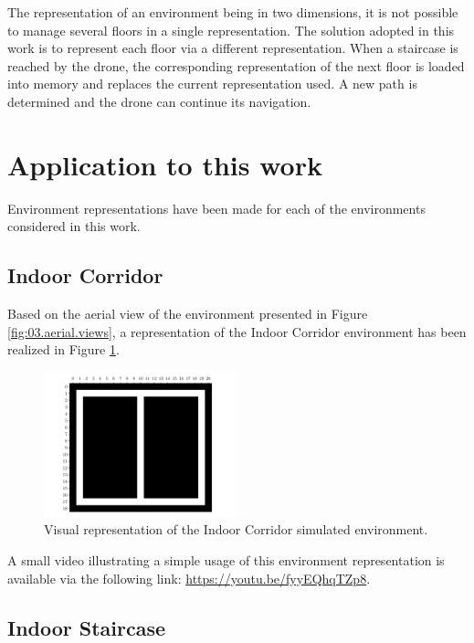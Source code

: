 The representation of an environment being in two dimensions, it is not possible to manage several floors in a single representation. The solution adopted in this work is to represent each floor via a different representation. When a staircase is reached by the drone, the corresponding representation of the next floor is loaded into memory and replaces the current representation used. A new path is determined and the drone can continue its navigation.

\section{Application to this work}

Environment representations have been made for each of the environments considered in this work.

\subsection{Indoor Corridor}

Based on the aerial view of the environment presented in Figure \ref{fig:03.aerial.views}, a representation of the Indoor Corridor environment has been realized in Figure \ref{fig:05.indoor.corridor.representation}.

\begin{figure}[H]
    \centering
    \includegraphics[width=0.5\textwidth]{resources/pdf/05/indoor-corridor/0.pdf}
    \caption{Visual representation of the Indoor Corridor simulated environment.}
    \label{fig:05.indoor.corridor.representation}
\end{figure}

A small video illustrating a simple usage of this environment representation is available via the following link: \url{https://youtu.be/fyyEQhqTZp8}.

\subsection{Indoor Staircase}

